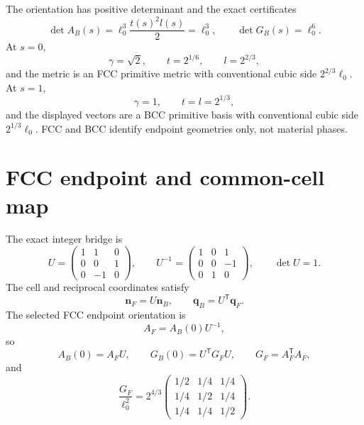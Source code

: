 \documentclass[11pt]{article}
\begin{document}
The orientation has positive determinant and the exact certificates
\begin{equation}
 \det A_B(s)=\ell_0^3\frac{t(s)^2l(s)}2=\ell_0^3,
 \qquad
 \det G_B(s)=\ell_0^6.
\end{equation}
At $s=0$,
\begin{equation}
 \gamma=\sqrt2,\qquad t=2^{1/6},\qquad l=2^{2/3},
\end{equation}
and the metric is an FCC primitive metric with conventional cubic side
$2^{2/3}\ell_0$.  At $s=1$,
\begin{equation}
 \gamma=1,\qquad t=l=2^{1/3},
\end{equation}
and the displayed vectors are a BCC primitive basis with conventional cubic side
$2^{1/3}\ell_0$.  FCC and BCC identify endpoint geometries only, not material phases.

\section{FCC endpoint and common-cell map}

The exact integer bridge is
\begin{equation}
 U=\begin{pmatrix}
 1&1&0\\0&0&1\\0&-1&0
 \end{pmatrix},
 \qquad
 U^{-1}=\begin{pmatrix}
 1&0&1\\0&0&-1\\0&1&0
 \end{pmatrix},
 \qquad \det U=1.
\end{equation}
The cell and reciprocal coordinates satisfy
\begin{equation}
 \mathbf n_F=U\mathbf n_B,
 \qquad
 \mathbf q_B=U^{\mathsf T}\mathbf q_F.
\end{equation}
The selected FCC endpoint orientation is
\begin{equation}
 A_F=A_B(0)U^{-1},
\end{equation}
so
\begin{equation}
 A_B(0)=A_FU,
 \qquad
 G_B(0)=U^{\mathsf T}G_FU,
 \qquad
 G_F=A_F^{\mathsf T}A_F,
\end{equation}
and
\begin{equation}
 \frac{G_F}{\ell_0^2}=2^{4/3}
 \begin{pmatrix}
 1/2&1/4&1/4\\
 1/4&1/2&1/4\\
 1/4&1/4&1/2
 \end{pmatrix}.
\end{equation}
\end{document}
